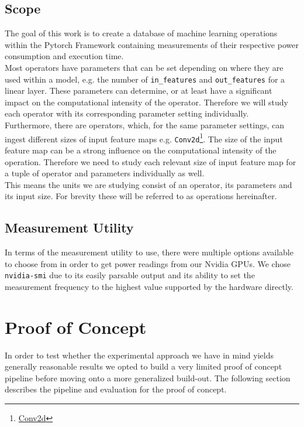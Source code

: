 \documentclass[conference]{IEEEtran}
\begin{document}
\subsection{Scope}
The goal of this work is to create a database of machine learning operations within the Pytorch Framework containing measurements of their respective power consumption and execution time. \\
Most operators have parameters that can be set depending on where they are used within a model, e.g. the number of \texttt{in\_features} and \texttt{out\_features} for a linear layer.
These parameters can determine, or at least have a significant impact on the computational intensity of the operator. Therefore we will study each operator with its corresponding parameter setting individually. \\
Furthermore, there are operators, which, for the same parameter settings, can ingest different sizes of input feature maps e.g. \texttt{Conv2d}\footnote{\href{https://pytorch.org/docs/stable/generated/torch.nn.Conv2d.html}{Conv2d}}. The size of the input feature map can be a strong influence on the computational intensity of the operation. Therefore we need to study each relevant size of input feature map for a tuple of operator and parameters individually as well. \\
This means the units we are studying consist of an operator, its parameters and its input size. For brevity these will be referred to as operations hereinafter.




\subsection{Measurement Utility}
In terms of the measurement utility to use, there were multiple options available to choose from in order to get power readings from our Nvidia GPUs. We chose \texttt{nvidia-smi} due to its easily parsable output and its ability to set the measurement frequency to the highest value supported by the hardware directly.


\section{Proof of Concept}

In order to test whether the experimental approach we have in mind yields generally reasonable results we opted to build a very limited proof of concept pipeline before moving onto a more generalized build-out. The following section describes the pipeline and evaluation for the proof of concept.
\end{document}
